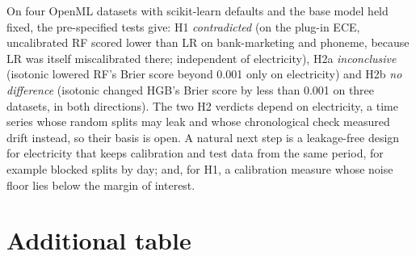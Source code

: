 \documentclass[11pt]{article}
\newcommand{\ds}[1]{\textsf{#1}}
\newcommand{\bm}{\ds{bank-marketing}}
\newcommand{\el}{\ds{electricity}}
\newcommand{\ph}{\ds{phoneme}}
\newcommand{\cat}[1]{\emph{#1}}
\begin{document}
On four OpenML datasets with scikit-learn defaults and the base model held fixed, the
pre-specified tests give: H1 \cat{contradicted} (on the plug-in ECE, uncalibrated RF scored
lower than LR on \bm{} and \ph, because LR was itself miscalibrated there; independent of
\el), H2a \cat{inconclusive} (isotonic lowered RF's Brier score beyond 0.001 only on \el) and
H2b \cat{no difference} (isotonic changed HGB's Brier score by less than 0.001 on three
datasets, in both directions). The two H2 verdicts depend on \el, a time series whose random
splits may leak and whose chronological check measured drift instead, so their basis is open.
A natural next step is a leakage-free design for \el{} that keeps calibration and test data
from the same period, for example blocked splits by day; and, for H1, a calibration measure
whose noise floor lies below the margin of interest.






\appendix
\section{Additional table}
\label{app:tables}

\begin{table}[!htbp]
\centering
\resizebox{\textwidth}{!}{}
\caption{Metric levels on the test split for every dataset, model and calibrator: plug-in ECE,
Brier score, log-loss (clipped at $10^{-6}$) and ROC-AUC, each as mean (SD) over 10 seeds, and
the mean number of non-empty ECE bins out of 15 (``Bins''). The SD is a seed spread, not a
confidence interval. Platt scaling is fitted on the logit of the clipped probability and is
descriptive only. AUC is a control: isotonic regression ties predictions and can lower AUC.
Bins below 15 mean that tied predictions merged bins (uncalibrated RF's outputs near
multiples of 0.01; isotonic's step function); ECE on fewer bins averages over coarser groups,
so ECE levels are compared across models with care. \ph's splits are smaller (training 2,702,
calibration and test 1,351), so its ECE noise floor is higher. \el's levels come from random
splits of a time series.}
\label{tab:levels}
\end{table}
\end{document}
